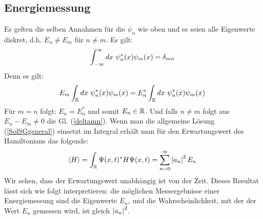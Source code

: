 \subsection{Energiemessung}
Es gelten die selben Annahmen für die $\psi_n$ wie oben und es seien alle
Eigenwerte diskret, d.h. $E_n \neq E_m$ für $n \neq m$. Es gilt:
\begin{align}\label{deltamn}
    \int_{-\infty}^\infty dx \ \psi_n^\ast (x) \psi_m (x) = \delta_{mn}
\end{align}
Denn es gilt:
\begin{align*}
    E_m \int_{\mathbb{R}} dx \ \psi_n^\ast (x) \psi_m(x)
    = E_n^\ast \int_{\mathbb{R}} dx \ \psi_n^\ast (x) \psi_m (x)
\end{align*}
Für $m=n$ folgt: $E_n = E_n^\ast$ und somit $E_n \in \mathbb{R}$. Und falls $n \neq m$
folgt aus $E_n - E_m \neq 0$ die Gl. (\ref{deltamn}).
Wenn man die allgemeine Lösung (\ref{SolSGgeneral}) einsetzt im Integral
erhält man für den Erwartungswert des Hamiltonians das folgende:
\begin{align*}
    \langle H \rangle = \int_{\mathbb{R}} \Psi(x,t)^\ast H \Psi(x,t)
    = \sum_{n=0}^\infty \left\vert a_n \right\vert^2 E_n
\end{align*}
Wir sehen, dass der Erwartungswert unabhängig ist von der Zeit.
Dieses Resultat lässt sich wie folgt interpretieren: die möglichen Messergebnisse
einer Energiemessung sind die Eigenwerte $E_n$, und die Wahrscheinlichkeit,
mit der der Wert $E_n$ gemessen wird, ist gleich $\left\vert a_n \right\vert^2$.

